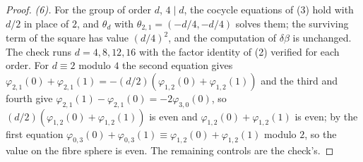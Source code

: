\begin{proof}
\emph{(6).} For the group of order $d$, $4 \mid d$, the cocycle equations of (3) hold with $d/2$ in place of $2$, and $\theta_{d}$ with $\theta_{2,1} = (-d/4, -d/4)$ solves them; the surviving term of the square has value $(d/4)^{2}$, and the computation of $\delta\beta$ is unchanged. The check runs $d = 4, 8, 12, 16$ with the factor identity of (2) verified for each order. For $d \equiv 2$ modulo $4$ the second equation gives $\varphi_{2,1}(0) + \varphi_{2,1}(1) = -(d/2)(\varphi_{1,2}(0) + \varphi_{1,2}(1))$ and the third and fourth give $\varphi_{2,1}(1) - \varphi_{2,1}(0) = -2\varphi_{3,0}(0)$, so $(d/2)(\varphi_{1,2}(0) + \varphi_{1,2}(1))$ is even and $\varphi_{1,2}(0) + \varphi_{1,2}(1)$ is even; by the first equation $\varphi_{0,3}(0) + \varphi_{0,3}(1) \equiv \varphi_{1,2}(0) + \varphi_{1,2}(1)$ modulo $2$, so the value on the fibre sphere is even. The remaining controls are the check's.
\end{proof}
